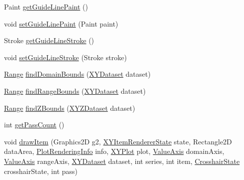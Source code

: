 \begin{DoxyCompactItemize}
\item 
Paint \mbox{\hyperlink{classorg_1_1jfree_1_1chart_1_1renderer_1_1xy_1_1_x_y_shape_renderer_a8fea22363f2ab58a536657b999cb1a5f}{get\+Guide\+Line\+Paint}} ()
\item 
void \mbox{\hyperlink{classorg_1_1jfree_1_1chart_1_1renderer_1_1xy_1_1_x_y_shape_renderer_a6f45190e4da92e6cf58f841923476157}{set\+Guide\+Line\+Paint}} (Paint paint)
\item 
Stroke \mbox{\hyperlink{classorg_1_1jfree_1_1chart_1_1renderer_1_1xy_1_1_x_y_shape_renderer_af24b2b683eed8f240256c64cc5282c1b}{get\+Guide\+Line\+Stroke}} ()
\item 
void \mbox{\hyperlink{classorg_1_1jfree_1_1chart_1_1renderer_1_1xy_1_1_x_y_shape_renderer_a6a2c1eabb72522fc743402238dc29453}{set\+Guide\+Line\+Stroke}} (Stroke stroke)
\item 
\mbox{\hyperlink{classorg_1_1jfree_1_1data_1_1_range}{Range}} \mbox{\hyperlink{classorg_1_1jfree_1_1chart_1_1renderer_1_1xy_1_1_x_y_shape_renderer_a84f6e58c06ea03d5084f82935f277fca}{find\+Domain\+Bounds}} (\mbox{\hyperlink{interfaceorg_1_1jfree_1_1data_1_1xy_1_1_x_y_dataset}{X\+Y\+Dataset}} dataset)
\item 
\mbox{\hyperlink{classorg_1_1jfree_1_1data_1_1_range}{Range}} \mbox{\hyperlink{classorg_1_1jfree_1_1chart_1_1renderer_1_1xy_1_1_x_y_shape_renderer_a45964746fcd8d2c928b9cb5932429600}{find\+Range\+Bounds}} (\mbox{\hyperlink{interfaceorg_1_1jfree_1_1data_1_1xy_1_1_x_y_dataset}{X\+Y\+Dataset}} dataset)
\item 
\mbox{\hyperlink{classorg_1_1jfree_1_1data_1_1_range}{Range}} \mbox{\hyperlink{classorg_1_1jfree_1_1chart_1_1renderer_1_1xy_1_1_x_y_shape_renderer_a2cde90f02e394826bb5a3db9c02f2958}{find\+Z\+Bounds}} (\mbox{\hyperlink{interfaceorg_1_1jfree_1_1data_1_1xy_1_1_x_y_z_dataset}{X\+Y\+Z\+Dataset}} dataset)
\item 
int \mbox{\hyperlink{classorg_1_1jfree_1_1chart_1_1renderer_1_1xy_1_1_x_y_shape_renderer_af6f4a145c9940d06f20e87e6e1727718}{get\+Pass\+Count}} ()
\item 
void \mbox{\hyperlink{classorg_1_1jfree_1_1chart_1_1renderer_1_1xy_1_1_x_y_shape_renderer_a3ad0051255b00a4c3045c21ed8198b34}{draw\+Item}} (Graphics2D g2, \mbox{\hyperlink{classorg_1_1jfree_1_1chart_1_1renderer_1_1xy_1_1_x_y_item_renderer_state}{X\+Y\+Item\+Renderer\+State}} state, Rectangle2D data\+Area, \mbox{\hyperlink{classorg_1_1jfree_1_1chart_1_1plot_1_1_plot_rendering_info}{Plot\+Rendering\+Info}} info, \mbox{\hyperlink{classorg_1_1jfree_1_1chart_1_1plot_1_1_x_y_plot}{X\+Y\+Plot}} plot, \mbox{\hyperlink{classorg_1_1jfree_1_1chart_1_1axis_1_1_value_axis}{Value\+Axis}} domain\+Axis, \mbox{\hyperlink{classorg_1_1jfree_1_1chart_1_1axis_1_1_value_axis}{Value\+Axis}} range\+Axis, \mbox{\hyperlink{interfaceorg_1_1jfree_1_1data_1_1xy_1_1_x_y_dataset}{X\+Y\+Dataset}} dataset, int series, int item, \mbox{\hyperlink{classorg_1_1jfree_1_1chart_1_1plot_1_1_crosshair_state}{Crosshair\+State}} crosshair\+State, int pass)

\end{DoxyCompactItemize}

